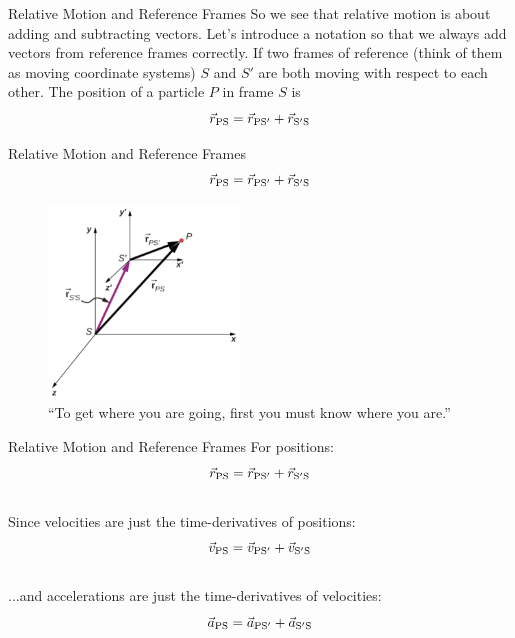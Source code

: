 \documentclass{beamer}
\begin{document}
\begin{frame}{Relative Motion and Reference Frames}
So we see that relative motion is about adding and subtracting vectors.  Let's introduce a notation so that we always add vectors from reference frames correctly.  If two frames of reference (think of them as moving coordinate systems) $S$ and $S'$ are both moving with respect to each other.  The position of a particle $P$ in frame $S$ is \\
\begin{equation}
\vec{r}_{\rm PS} = \vec{r}_{\rm PS'} + \vec{r}_{\rm S'S}
\end{equation}
\end{frame}

\begin{frame}{Relative Motion and Reference Frames}
\small
\begin{equation}
\vec{r}_{\rm PS} = \vec{r}_{\rm PS'} + \vec{r}_{\rm S'S}
\end{equation}
\begin{figure}
\centering
\includegraphics[width=0.45\textwidth]{figures/frames.png}
\caption{\label{fig:frame} \small ``To get where you are going, first you must know where you are.''}
\end{figure}
\end{frame}

\begin{frame}{Relative Motion and Reference Frames}
For positions:
\begin{equation}
\vec{r}_{\rm PS} = \vec{r}_{\rm PS'} + \vec{r}_{\rm S'S}
\end{equation}\\
Since velocities are just the time-derivatives of positions:
\begin{equation}
\vec{v}_{\rm PS} = \vec{v}_{\rm PS'} + \vec{v}_{\rm S'S}
\end{equation}\\
...and accelerations are just the time-derivatives of velocities:
\begin{equation}
\vec{a}_{\rm PS} = \vec{a}_{\rm PS'} + \vec{a}_{\rm S'S}
\end{equation}
\end{frame}
\end{document}
